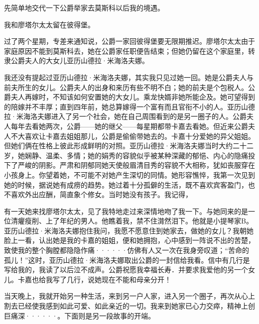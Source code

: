 \documentclass[12pt, UTF8]{ctexbook}
\begin{document}
\par 先简单地交代一下公爵举家去莫斯科以后我的境遇。
\par 我和廖塔尔太太留在彼得堡。
\par 过了两个星期，专差来通知说，公爵一家回彼得堡要无限期推迟。廖塔尔太太由于家庭原因不能到莫斯科去，她在公爵家任职便告结束；但她仍留在这个家庭里，转隶公爵夫人的大女儿亚历山德拉·米海洛夫娜。
\par 我还没有提起过亚历山德拉·米海洛夫娜，其实我只见过她一回。她是公爵夫人与前夫所生的女儿。公爵夫人的出身和来历有些不明不白；她的前夫是个包税人。公爵夫人再嫁时，不知该如何安置她的大女儿。乘龙快婿非她所能企及。她可望得到的陪嫁并不丰厚；直到四年前，她总算嫁得一个富有而且官衔不小的人。亚历山德拉·米海洛夫娜进入了另一个社会，她在自己周围看到的是另一圈子的人。公爵夫人每年去看她两次，公爵——她的继父——每星期都带卡嘉去看她。但近来公爵夫人不大喜欢让卡嘉去姐姐那儿，公爵是偷偷带她去的。卡嘉十分爱她的异父姐姐。但她们俩在性格上彼此形成鲜明的对照。亚历山德拉·米海洛夫娜当时大约二十二岁，她娴静、温柔、多情；她的娟秀的容貌似乎被某种深藏的郁悒、内心的隐痛投下了严峻的阴影。严肃和阴郁同她天使般眉清目秀的容貌不大相称，犹如丧服穿在小孩身上。你望着她，不可能不对她产生深切的同情。她形容憔悴，我第一次见到她的时候，据说她有成痨的趋势。她过着十分孤僻的生活，既不喜欢宾客盈门，也不喜欢外出应酬，简直象个修女。当时她没有孩子。我记得，
\par 有一天她来找廖塔尔太太，见了我特地走过来深情地吻了我一下。与她同来的是一位清癯瘦削、上了年纪的男人。他瞧着我，禁不住潸然泪下。他就是小提琴家B。亚历山德拉·米海洛夫娜抱住我问，我愿不愿意住到她家去，做她的女儿？我朝她脸上一看，认出她是我的卡嘉的姐姐，便和她拥抱，心中感到一阵说不出的苦楚，致使我的整个胸膛都隐隐作痛······仿佛有人又一次在我身旁叹道；“苦命的孤儿！”这时，亚历山德拉·米海洛夫娜取出公爵的一封信给我看。信中有几行是写给我的，我读了以后泣不成声。公爵祝愿我幸福长寿．并要求我爱他的另一个女儿。卡嘉也给我写了几行，说她现在不能和母亲分开！
\par 当天晚上，我就开始另一种生活，来到另一户人家，进入另一个圈子，再次从心上割去已经使我感到如此可爱、如此亲近的一切。我来到她家已心力交瘁，精神上创巨痛深······。下面则是另一段故事的开端。
\newpage
\end{document}
